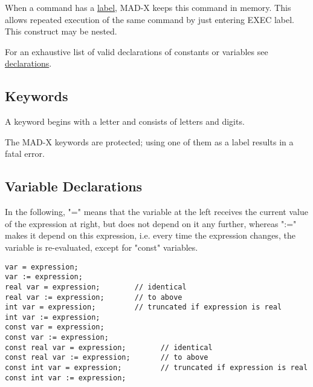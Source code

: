 When a command has a \href{label.html}{label}, MAD-X keeps this command
in memory. This allows repeated execution of the same command
by just entering EXEC label. This construct may be nested.

For an exhaustive list of valid declarations of constants or variables
see \href{declarations.html}{declarations}.



%
\subsection{Keywords}
\label{subsec:keyword}

A keyword begins with a letter and consists of letters and digits. 

The MAD-X keywords are protected; using one of them as a label results
in a fatal error.   

%
\subsection{Variable Declarations}
\label{subsec:var_declarations}

In the following, "=" means that the variable at the left receives the
current value of the expression at right, but does not depend on it any
further, whereas ":=" makes it depend on this expression, i.e. every
time the expression changes, the variable is re-evaluated, except for
"const" variables.  

\begin{verbatim}
var = expression;
var := expression;
real var = expression;        // identical
real var := expression;       // to above
int var = expression;         // truncated if expression is real
int var := expression;
const var = expression;
const var := expression;
const real var = expression;        // identical
const real var := expression;       // to above
const int var = expression;         // truncated if expression is real
const int var := expression;
\end{verbatim}

%

